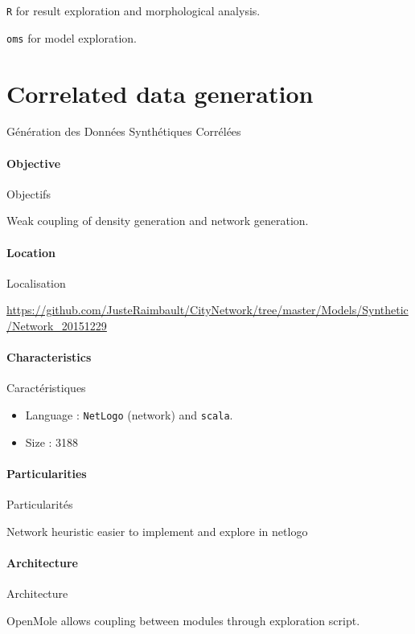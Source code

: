 \texttt{R} for result exploration and morphological analysis.

\texttt{oms} for model exploration.





\section{Correlated data generation}{Génération des Données Synthétiques Corrélées}

\paragraph{Objective}{Objectifs}

Weak coupling of density generation and network generation.

\paragraph{Location}{Localisation}

\url{https://github.com/JusteRaimbault/CityNetwork/tree/master/Models/Synthetic/Network_20151229}

\paragraph{Characteristics}{Caractéristiques}

\begin{itemize}
\item Language : \texttt{NetLogo} (network) and \texttt{scala}.
\item Size : 3188
\end{itemize}


\paragraph{Particularities}{Particularités}

Network heuristic easier to implement and explore in netlogo

\paragraph{Architecture}{Architecture}

OpenMole allows coupling between modules through exploration script.

